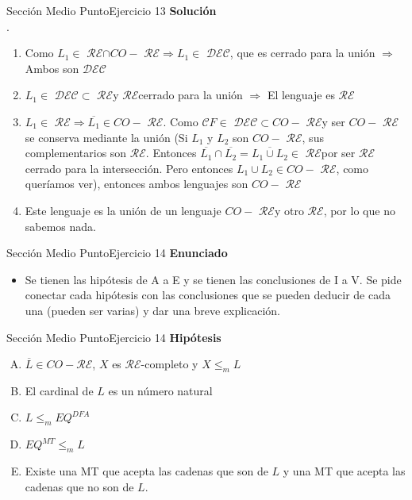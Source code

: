 \documentclass[10pt, envcountsect, presentation, aspectratio=169]{beamer}
\newcommand{\lcf}{\ensuremath{\mathcal CF}}
\newcommand{\ld}{\ensuremath{\mathcal {DEC}}}
\newcommand{\lr}{\ensuremath{\mathcal {RE}}}
\begin{document}
\begin{frame}{Sección Medio Punto}{Ejercicio 13}
    \textbf{Solución}\\
    .
    \begin{enumerate}[label=(\arabic*)]
        \item[(10, 11)] Como $L_1 \in$ \lr $\cap CO-$ \lr $\Rightarrow L_1 \in$ \ld, que es cerrado para la unión $\Rightarrow$ Ambos son \ld
        \item[(12)] $L_1\in$ \ld $\subset$ \lr y  \lr \space cerrado para la unión $\Rightarrow$ El lenguaje es \lr
        \item[(13, 14)] $L_1 \in$ \lr $\Rightarrow \overline{L_1} \in CO-$ \lr. Como \lcf $\in$ \ld $\subset CO-$ \lr y ser $CO-$ \lr se conserva mediante la unión (Si $L_1$ y $L_2$ son $CO-$ \lr, sus complementarios son \lr. Entonces $\overline{L_1} \cap \overline{L_2} = \overline{L_1 \cup L_2} \in$ \lr por ser \lr cerrado para la intersección. Pero entonces $L_1 \cup L_2 \in CO-$ \lr, como queríamos ver), entonces ambos lenguajes son $CO-$ \lr
        \item[(15)] Este lenguaje es la unión de un lenguaje $CO-$ \lr y otro \lr, por lo que no sabemos nada.
    \end{enumerate}
\end{frame}

\begin{frame}{Sección Medio Punto}{Ejercicio 14}
    \textbf{Enunciado}
    \begin{itemize}
        \item Se tienen las hipótesis de A a E y se tienen las conclusiones de I a V. Se pide conectar cada hipótesis con las conclusiones que se pueden deducir de cada una (pueden ser varias) y dar una breve explicación.
    \end{itemize}
\end{frame}


\begin{frame}{Sección Medio Punto}{Ejercicio 14}
    \textbf{Hipótesis}
    \begin{enumerate}[A.]
        \item $\overline{L} \in CO-\lr$, $X$ es \lr-completo y $X \le_m  L$
        \item El cardinal de $L$ es un número natural
        \item $L \le_m  EQ^{DFA}$  
        \item $EQ^{MT} \le_m L$ 
        \item Existe una MT que acepta las cadenas que son de $L$ y una MT que acepta las cadenas que no son de $L$. 
    \end{enumerate}
\end{frame}
\end{document}

